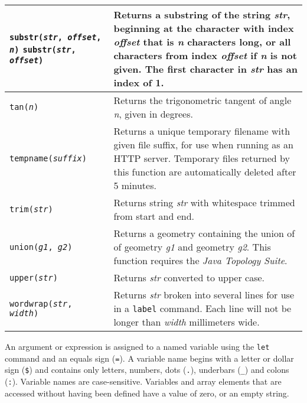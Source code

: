 \begin{longtable}{|p{5cm}|p{7cm}|}
\hline

\texttt{substr(\textit{str}, \textit{offset}, \textit{n})}
\texttt{substr(\textit{str}, \textit{offset})} &
Returns a substring of the string \textit{str}, beginning at the
character with index \textit{offset} that is \textit{n} characters long,
or all characters from index \textit{offset} if
\textit{n} is not given.
The first character in \textit{str} has an index of 1. \\

\hline

\texttt{tan(\textit{n})} &
Returns the trigonometric tangent of angle \textit{n}, given in degrees. \\

\hline

\texttt{tempname(\textit{suffix})} &
Returns a unique temporary filename with given file suffix,
for use when running as an HTTP server.
Temporary files returned by this function
are automatically deleted after 5 minutes. \\

\hline
\texttt{trim(\textit{str})} &
Returns string \textit{str} with whitespace trimmed from start and end. \\

\hline

\texttt{union(\textit{g1}, \textit{g2})} &
Returns a geometry containing the union of 
of geometry \textit{g1} and geometry \textit{g2}.
This function requires the \textit{Java Topology Suite}. \\

\hline

\texttt{upper(\textit{str})} &
Returns \textit{str} converted to upper case. \\

\hline

\texttt{wordwrap(\textit{str}, \textit{width})} &
Returns \textit{str} broken into several lines for
use in a \texttt{label} command.
Each line will not be
longer than \textit{width} millimeters wide. \\

\hline
\end{longtable}

An argument or expression is assigned to a named variable using the
\texttt{let} command and an equals sign (\texttt{=}).  A variable name begins
with a letter or dollar sign (\texttt{\$}) and contains only letters, numbers,
dots (\texttt{.}), underbars (\texttt{\_}) and colons (\texttt{:}).
Variable names are
case-sensitive.  Variables and array elements that are accessed without having
been defined have a value of zero, or an empty string.

